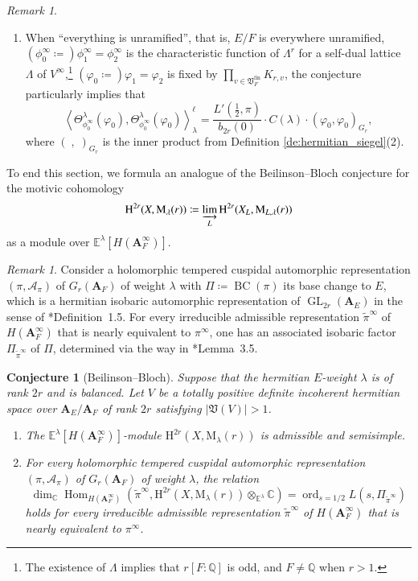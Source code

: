 \documentclass[12pt]{amsart}
\numberwithin{equation}{section}
\theoremstyle{plain}
\newtheorem{conjecture}[proposition]{Conjecture}
\theoremstyle{definition}
\theoremstyle{remark}
\newtheorem{remark}[proposition]{Remark}
\renewcommand{\b}[1]{\mathbf{#1}}
\renewcommand{\c}[1]{\mathcal{#1}}
\renewcommand{\d}[1]{\mathbb{#1}}
\newcommand{\f}[1]{\mathfrak{#1}}
\renewcommand{\r}[1]{\mathrm{#1}}
\renewcommand{\(}{\left(}
\renewcommand{\)}{\right)}
\newcommand{\bA}{\b A}
\newcommand{\cA}{\c A}
\newcommand{\dC}{\d C}
\newcommand{\dE}{\d E}
\newcommand{\dQ}{\d Q}
\newcommand{\fV}{\f V}
\newcommand{\rH}{\r H}
\newcommand{\rM}{\r M}
\newcommand{\llangle}{\left\langle}
\newcommand{\rrangle}{\right\rangle}
\newcommand{\fin}{\r{fin}}
\DeclareMathOperator{\BC}{BC}
\DeclareMathOperator{\GL}{GL}
\DeclareMathOperator{\Hom}{Hom}
\DeclareMathOperator{\ord}{ord}
\begin{document}
\begin{remark}
\begin{enumerate}
  \item When ``everything is unramified'', that is, $E/F$ is everywhere unramified, $(\phi^\infty_0\coloneqq)\phi^\infty_1=\phi^\infty_2$ is the characteristic function of $\Lambda^r$ for a self-dual lattice $\Lambda$ of $V^\infty$,\footnote{The existence of $\Lambda$ implies that $r[F:\dQ]$ is odd, and $F\neq\dQ$ when $r>1$.} $(\varphi_0\coloneqq)\varphi_1=\varphi_2$ is fixed by $\prod_{v\in\fV_F^\fin}K_{r,v}$, the conjecture particularly implies that
      \[
      \llangle\Theta_{\phi^\infty_0}^\lambda(\varphi_0),\Theta_{\phi^\infty_0}^\lambda(\varphi_0)\rrangle_\lambda^\ell
      =\frac{L'(\tfrac{1}{2},\pi)}{b_{2r}(0)}\cdot C(\lambda)\cdot(\varphi_0,\varphi_0)_{G_r},
      \]
      where $(\;,\;)_{G_r}$ is the inner product from Definition \ref{de:hermitian_siegel}(2).
\end{enumerate}
\end{remark}



To end this section, we formula an analogue of the Beilinson--Bloch conjecture for the motivic cohomology
\[
\rH^{2r}(X,\rM_{\lambda}(r))\coloneqq\varinjlim_L\rH^{2r}(X_L,\rM_{L,\lambda}(r))
\]
as a module over $\dE^\lambda[H(\bA_F^\infty)]$.


\begin{remark}\label{re:endoscopic}
Consider a holomorphic tempered cuspidal automorphic representation $(\pi,\cA_\pi)$ of $G_r(\bA_F)$ of weight $\lambda$ with $\Pi\coloneqq\BC(\pi)$ its base change to $E$, which is a hermitian isobaric automorphic representation of $\GL_{2r}(\bA_E)$ in the sense of \cite{BPLZZ21}*{Definition~1.5}. For every irreducible admissible representation $\tilde\pi^\infty$ of $H(\bA_F^\infty)$ that is nearly equivalent to $\pi^\infty$, one has an associated isobaric factor $\Pi_{\tilde\pi^\infty}$ of $\Pi$, determined via the way in \cite{LL21}*{Lemma~3.5}.
\end{remark}



\begin{conjecture}[Beilinson--Bloch]\label{co:beilinson}
Suppose that the hermitian $E$-weight $\lambda$ is of rank $2r$ and is balanced. Let $V$ be a totally positive definite incoherent hermitian space over $\bA_E/\bA_F$ of rank $2r$ satisfying $|\fV(V)|>1$.
\begin{enumerate}
  \item The $\dE^\lambda[H(\bA_F^\infty)]$-module $\rH^{2r}(X,\rM_{\lambda}(r))$ is admissible and semisimple.

  \item For every holomorphic tempered cuspidal automorphic representation $(\pi,\cA_\pi)$ of $G_r(\bA_F)$ of weight $\lambda$, the relation
      \[
      \dim_\dC\Hom_{H(\bA_F^\infty)}\(\tilde\pi^\infty,\rH^{2r}(X,\rM_{\lambda}(r))\otimes_{\dE^\lambda}\dC\)=
      \ord_{s=1/2}L(s,\Pi_{\tilde\pi^\infty})
      \]
      holds for every irreducible admissible representation $\tilde\pi^\infty$ of $H(\bA_F^\infty)$ that is nearly equivalent to $\pi^\infty$.
\end{enumerate}
\end{conjecture}
\end{document}
